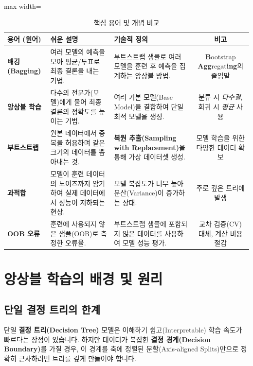 \documentclass[11pt,a4paper]{book}
\theoremstyle{definition}
\begin{document}
\begin{table}[h!]
\centering
\caption{핵심 용어 및 개념 비교}
\label{tab:terms}
\begin{adjustbox}{max width=\textwidth}
\begin{tabular}{lllc}
\toprule
\textbf{용어 (원어)} & \textbf{쉬운 설명} & \textbf{기술적 정의} & \textbf{비고} \\
\midrule
\textbf{배깅 (Bagging)} & 여러 모델의 예측을 모아 평균/투표로 최종 결론을 내는 기법. & 부트스트랩 샘플로 여러 모델을 훈련 후 예측을 집계하는 앙상블 방법. & \textbf{B}ootstrap \textbf{Agg}regat\textbf{ing}의 줄임말 \\
\textbf{앙상블 학습} & 다수의 전문가(모델)에게 물어 최종 결론의 정확도를 높이는 기법. & 여러 기본 모델(Base Model)을 결합하여 단일 최적 모델을 생성. & 분류 시 \textit{다수결}, 회귀 시 \textit{평균} 사용 \\
\textbf{부트스트랩} & 원본 데이터에서 중복을 허용하며 같은 크기의 데이터를 뽑아내는 것. & \textbf{복원 추출(Sampling with Replacement)}을 통해 가상 데이터셋 생성. & 모델 학습을 위한 다양한 데이터 확보 \\
\textbf{과적합} & 모델이 훈련 데이터의 노이즈까지 암기하여 실제 데이터에서 성능이 저하되는 현상. & 모델 복잡도가 너무 높아 분산(Variance)이 증가하는 상태. & 주로 깊은 트리에 발생 \\
\textbf{OOB 오류} & 훈련에 사용되지 않은 샘플(OOB)로 측정한 오류율. & 부트스트랩 샘플에 포함되지 않은 데이터를 사용하여 모델 성능 평가. & 교차 검증(CV) 대체, 계산 비용 절감 \\
\bottomrule
\end{tabular}
\end{adjustbox}
\end{table}


\section{앙상블 학습의 배경 및 원리}
\label{sec:ensemble_principle}

\subsection{단일 결정 트리의 한계}

단일 \textbf{결정 트리(Decision Tree)} 모델은 이해하기 쉽고(Interpretable) 학습 속도가 빠르다는 장점이 있습니다.
하지만 데이터가 복잡한 \textbf{결정 경계(Decision Boundary)}를 가질 경우, 이 경계를 축에 정렬된 분할(Axis-aligned Splits)만으로 정확히 근사하려면 트리를 깊게 만들어야 합니다.
\end{document}
